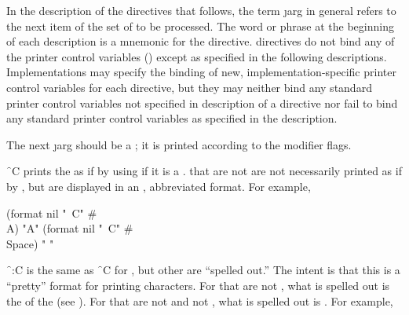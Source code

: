 

In the description of the directives that follows,
the term \j{arg} in general
refers to the next item of the set of  to be processed.
The word or phrase at the beginning of each description is a mnemonic
for the directive.
 directives do not bind any of the printer control
variables () except as specified in the following
descriptions.
   Implementations may specify the binding of new, implementation-specific 
printer control variables for each  directive, but they
    may neither bind any standard printer control variables not
    specified in description of a  
directive nor fail to bind
    any standard printer control variables as specified in the
    description.

%




               
The next \j{arg} should be a ; 
it is printed
according to the modifier flags.


\f{~C} prints the  
as if by using  if it is a .
 that are not 
are not necessarily printed as if by ,
but are displayed in an , abbreviated format.
For example,

\code
 (format nil "~C" #\\A) \EV "A"
 (format nil "~C" #\\Space) \EV " "
\endcode
{}

\f{~:C} is the same as \f{~C} for  ,
but other  are ``spelled out.''  The intent is that this
is a ``pretty'' format for printing characters.
For   that are not ,
what is spelled out is the  of the  (see ).
For  that are not  and not ,
what is spelled out is .
For example, 

